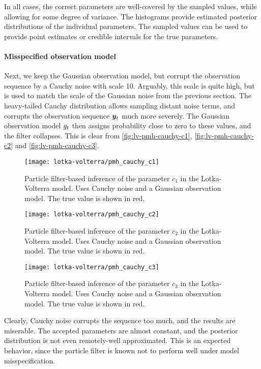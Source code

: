 In all cases, the correct parameters are well-covered by the sampled values, while allowing for some degree of variance. The histograms provide estimated posterior distributions of the individual parameters. The sampled values can be used to provide point estimates or credible intervals for the true parameters.

\paragraph{Misspecified observation model}
Next, we keep the Gaussian observation model, but corrupt the observation sequence by a Cauchy noise with scale 10. Arguably, this scale is quite high, but is used to match the scale of the Gaussian noise from the previous section. The heavy-tailed Cauchy distribution allows sampling distant noise terms, and corrupts the observation sequence $\bm{y}_t$ much more severely. The Gaussian observation model $g_t$ then assigns probability close to zero to these values, and the filter collapses. This is clear from \autoref{fig:lv-pmh-cauchy-c1}, \autoref{fig:lv-pmh-cauchy-c2} and \autoref{fig:lv-pmh-cauchy-c3}.

\begin{figure}[htp]
    \centering
    \texttt{[image: lotka-volterra/pmh\_cauchy\_c1]}
    \caption{Particle filter-based inference of the parameter $c_1$ in the Lotka-Volterra model. Uses Cauchy noise and a Gaussian observation model. The true value is shown in red.}
    \label{fig:lv-pmh-cauchy-c1}
\end{figure}

\begin{figure}[htp]
    \centering
    \texttt{[image: lotka-volterra/pmh\_cauchy\_c2]}
    \caption{Particle filter-based inference of the parameter $c_2$ in the Lotka-Volterra model. Uses Cauchy noise and a Gaussian observation model. The true value is shown in red.}
    \label{fig:lv-pmh-cauchy-c2}
\end{figure}

\begin{figure}[htp]
    \centering
    \texttt{[image: lotka-volterra/pmh\_cauchy\_c3]}
    \caption{Particle filter-based inference of the parameter $c_3$ in the Lotka-Volterra model. Uses Cauchy noise and a Gaussian observation model. The true value is shown in red.}
    \label{fig:lv-pmh-cauchy-c3}
\end{figure}

Clearly, Cauchy noise corrupts the sequence too much, and the results are miserable. The accepted parameters are almost constant, and the posterior distribution is not even remotely-well approximated. This is an expected behavior, since the particle filter is known not to perform well under model misspecification.



